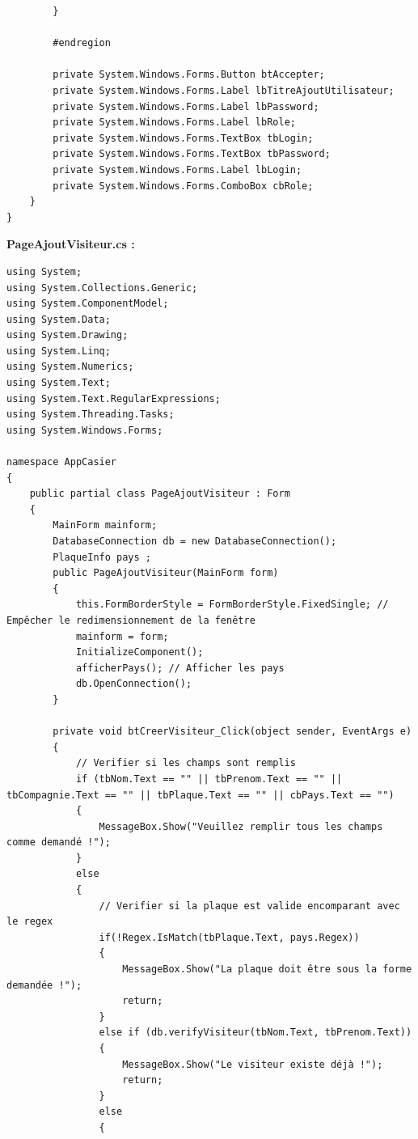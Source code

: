 \documentclass[main.tex]{subfiles}
\begin{document}
\begin{lstlisting}
        }

        #endregion

        private System.Windows.Forms.Button btAccepter;
        private System.Windows.Forms.Label lbTitreAjoutUtilisateur;
        private System.Windows.Forms.Label lbPassword;
        private System.Windows.Forms.Label lbRole;
        private System.Windows.Forms.TextBox tbLogin;
        private System.Windows.Forms.TextBox tbPassword;
        private System.Windows.Forms.Label lbLogin;
        private System.Windows.Forms.ComboBox cbRole;
    }
}
\end{lstlisting}


\textbf{PageAjoutVisiteur.cs :}

\begin{lstlisting}
using System;
using System.Collections.Generic;
using System.ComponentModel;
using System.Data;
using System.Drawing;
using System.Linq;
using System.Numerics;
using System.Text;
using System.Text.RegularExpressions;
using System.Threading.Tasks;
using System.Windows.Forms;

namespace AppCasier
{
    public partial class PageAjoutVisiteur : Form
    {
        MainForm mainform;
        DatabaseConnection db = new DatabaseConnection();
        PlaqueInfo pays ;
        public PageAjoutVisiteur(MainForm form)
        {
            this.FormBorderStyle = FormBorderStyle.FixedSingle; // Empêcher le redimensionnement de la fenêtre
            mainform = form;
            InitializeComponent();
            afficherPays(); // Afficher les pays
            db.OpenConnection();
        }

        private void btCreerVisiteur_Click(object sender, EventArgs e)
        {
            // Verifier si les champs sont remplis
            if (tbNom.Text == "" || tbPrenom.Text == "" || tbCompagnie.Text == "" || tbPlaque.Text == "" || cbPays.Text == "")
            {
                MessageBox.Show("Veuillez remplir tous les champs comme demandé !");
            }
            else
            {
                // Verifier si la plaque est valide encomparant avec le regex
                if(!Regex.IsMatch(tbPlaque.Text, pays.Regex))
                {
                    MessageBox.Show("La plaque doit être sous la forme demandée !");
                    return;
                }
                else if (db.verifyVisiteur(tbNom.Text, tbPrenom.Text))
                {
                    MessageBox.Show("Le visiteur existe déjà !");
                    return;
                }
                else
                {
                    


\end{lstlisting}
\end{document}
